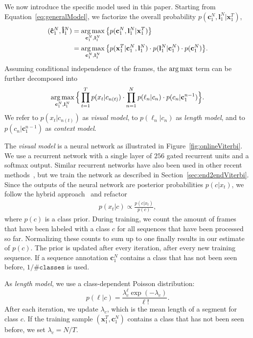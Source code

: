 \documentclass[10pt,twocolumn,letterpaper]{article}
\newcommand{\argmax}{\operatornamewithlimits{arg\,max}}
\begin{document}
We now introduce the specific model used in this paper. Starting from Equation~\eqref{eq:generalModel},
we factorize the overall probability $ p(\mathbf{c}_1^N, \mathbf{l}_1^N | \mathbf{x}_1^T) $,
\begin{align}
    (\mathbf{\hat c}_1^N, \mathbf{\hat l}_1^N) &= \argmax_{\mathbf{c}_1^N, \mathbf{l}_1^N} \big\{ p(\mathbf{c}_1^N, \mathbf{l}_1^N | \mathbf{x}_1^T) \big\} \nonumber \\
                                               &= \argmax_{\mathbf{c}_1^N, \mathbf{l}_1^N} \big\{ p(\mathbf{x}_1^T|\mathbf{c}_1^N,\mathbf{l}_1^N) \cdot p(\mathbf{l}_1^N|\mathbf{c}_1^N) \cdot p(\mathbf{c}_1^N) \big\}.
\end{align}
Assuming conditional independence of the frames, the $ \argmax $ term can be further decomposed into
\begin{align}
    \argmax_{\mathbf{c}_1^N, \mathbf{l}_1^N} \Big\{ \prod_{t=1}^T p(x_t|c_{n(t)}) \cdot \prod_{n=1}^N p(\ell_n|c_n) \cdot p(c_n|\mathbf{c}_1^{n-1}) \Big\}.
    \label{eq:model}
\end{align}
We refer to $ p(x_t|c_{n(t)}) $ as \textit{visual model}, to $ p(\ell_n|c_n) $ as
\textit{length model}, and to $ p(c_n|\mathbf{c}_1^{n-1}) $ as \textit{context model}.

The \textit{visual model} is a neural network as illustrated in Figure~\ref{fig:onlineViterbi}. We use a recurrent network with a single layer of $ 256 $ gated recurrent units
and a softmax output. Similar recurrent networks have also been used in other
recent methods~\cite{huang2016connectionist,richard2017weakly}, but we train the network as described in Section~\ref{sec:end2endViterbi}. Since the outputs of the neural network are posterior probabilities $ p(c|x_t) $, we follow the hybrid approach~\cite{bourlard2012connectionist} and refactor
\begin{align}
    p(x_t|c) \propto \frac{p(c|x_t)}{p(c)},
    \label{eq:hybrid}
\end{align}
where $ p(c) $ is a class prior. During training, we count the amount of frames that have
been labeled with a class $ c $ for all sequences that have been processed so far.
Normalizing these counts to sum up to one finally results in our estimate of $ p(c) $.
The prior is updated after every iteration, \ie after every new training sequence.
If a sequence annotation $ \mathbf{c}_1^N $ contains a class that has not been seen
before, $ 1 / \mathtt{\#classes} $ is used.

As \textit{length model}, we use a class-dependent Poisson distribution:  
\begin{equation}
p(\ell|c) = \frac{\lambda_c^\ell\exp\left(-\lambda_c\right)}{\ell!}. 
\end{equation}
After each iteration, we update $\lambda_c$, which is the mean length of a segment for class $c$.
If the training sample $ (\mathbf{x}_1^T,\mathbf{c}_1^N) $ contains a class that has not been seen before, we set \mbox{$ \lambda_c = N/T $.}
\end{document}
